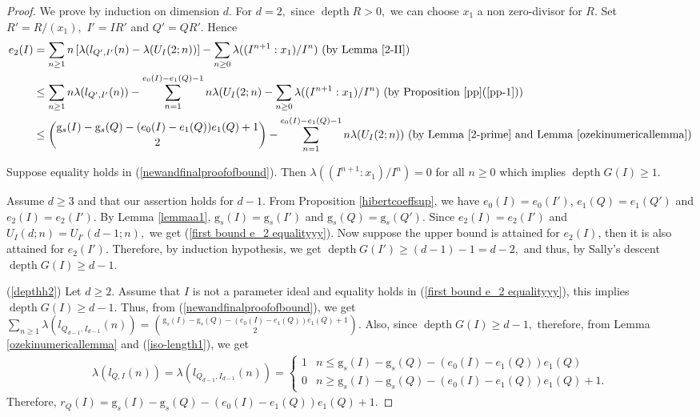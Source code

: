 \documentclass[reqno,a4paper,dvipsnames]{amsart}
\newcommand{\depth}{\operatorname{depth}}
\theoremstyle{definition}
\begin{document}
\begin{proof} 
 We prove by induction on dimension $d$. For $d=2,$ since $\depth R>0,$ we can choose $x_{1}$ a non zero-divisor for $R.$ Set $R'=R/(x_{1}),$ $I'=IR'$ and $Q'=QR'$. Hence
\small{\begin{align} \nonumber \label{newandfinalproofofbound}
    e_{2}(I) &= \displaystyle\sum_{n \geq 1} n\left[\lambda(l_{Q', I'}(n)
- \lambda(U_{I}(2;n))\right]
-  \displaystyle \sum_{n\geq 0}\lambda((I^{n+1}:x_{1})/I^{n}) \text{ (by Lemma \ref{2-II})}\\ \nonumber
& \leq \displaystyle\sum_{n \geq 1} n\lambda(l_{Q', I'}(n))
-\displaystyle \sum_{n= 1}^{e_{0}(I)-e_{1}(Q)-1}n\lambda(U_{I}(2;n)
-\displaystyle \sum_{n\geq 0}\lambda((I^{n+1}:x_{1})/I^{n}) \text{ (by Proposition \ref{pp}(\ref{pp-1}))}\\
& \leq \displaystyle\binom{\mathrm{g}_s(I) - \mathrm{g}_s(Q) - (e_{0}(I)-e_{1}(Q))e_1(Q) + 1}{2}-\displaystyle \sum_{n=1}^{e_{0}(I)-e_{1}(Q)-1}
           n\lambda(U_{I}(2;n)) \text{  (by Lemma \ref{2-prime} and Lemma \ref{ozekinumericallemma})}
\end{align}}



  \normalsize
  Suppose equality holds in (\ref{newandfinalproofofbound}). Then   $\lambda\left((I^{n+1}:x_{1})/I^{n}\right)=0$ for all $n \geq 0$ which implies $\depth G(I) \geq 1.$ 
  
 
 
Assume $d \geq 3$ and that our assertion holds for $d-1.$   
From Proposition \ref{hibertcoeffsup}, we have $e_{0}(I) = e_{0}(I')$, $e_{1}(Q) = e_{1}(Q')$ and $e_{2}(I) = e_{2}(I')$. By Lemma \ref{lemmaa1}, $\mathrm{g}_s(I) = \mathrm{g}_s(I')$ and $\mathrm{g}_s(Q) = \mathrm{g}_s(Q')$. 
Since $e_{2}(I) = e_{2}(I')$ and $U_{I}(d;n)=U_{I'}(d-1;n),$ 
we get (\ref{first bound e_2 equalityyy}). Now suppose the upper bound is attained for $e_2(I)$, then it is also attained for $e_2(I').$ Therefore, by induction hypothesis, we get $\depth G(I') \geq (d-1)-1=d-2,$ and  thus, by Sally's descent $\depth G(I) \geq d-1.$ 

(\ref{depthh2})
Let $d \geq 2$. Assume that  $I$ is not a parameter ideal and equality holds in  (\ref{first bound e_2 equalityyy}), this implies $\depth G(I) \geq d-1.$ Thus, from  (\ref{newandfinalproofofbound}), we get $\displaystyle \sum_{n \geq 1}\lambda( l_{Q_{d-1},I_{d-1}}(n))=\binom{ \mathrm{g}_{s}(I)-\mathrm{g}_{s}(Q)-(e_{0}(I)-e_{1}(Q))e_{1}(Q)+1}{2}.$  Also, since $\depth G(I) \geq d-1,$ therefore, from Lemma \ref{ozekinumericallemma} and (\ref{iso-length1}), we get
\begin{eqnarray}
\label{length of lnq}
 \lambda( l_{Q,I}(n))   
 = \lambda( l_{Q_{d-1},I_{d-1}}(n))
 = \begin{cases}
 1 & n \leq \mathrm{g}_{s}(I)-\mathrm{g}_{s}(Q)-(e_{0}(I)-e_{1}(Q))e_{1}(Q)\\
 0 & n \geq \mathrm{g}_{s}(I)-\mathrm{g}_{s}(Q)-(e_{0}(I)-e_{1}(Q))e_{1}(Q)+1.
 \end{cases}
\end{eqnarray}
Therefore, $r_{Q}(I)= \mathrm{g}_{s}(I)-\mathrm{g}_{s}(Q)-(e_{0}(I)-e_{1}(Q))e_{1}(Q)+1.$




\end{proof}
\end{document}
